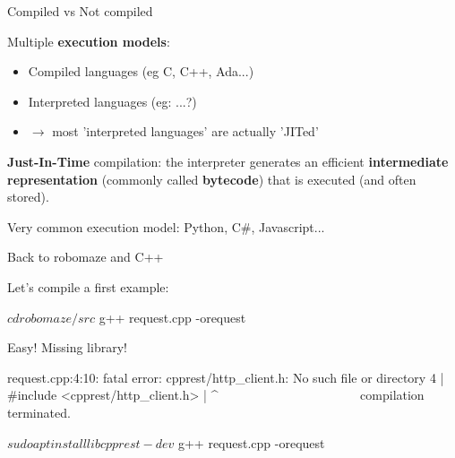 \documentclass[compress]{beamer}
\begin{document}
\begin{frame}{Compiled vs Not compiled}

    Multiple \textbf{execution models}:

    \begin{itemize}
        \item<1-> Compiled languages (eg C, C++, Ada...)
        \item<2-> Interpreted languages (eg: ...?)
        \item<3-> $\rightarrow$ most 'interpreted languages' are actually 'JITed'
    \end{itemize}

     {

    \textbf{Just-In-Time} compilation: the interpreter generates an efficient
    \textbf{intermediate representation} (commonly called \textbf{bytecode})
    that is executed (and often stored).

    Very common execution model: Python, C\#, Javascript...

    }
\end{frame}

\begin{frame}[fragile]{Back to robomaze and C++}

Let's compile a first example:

 \begin{shcode}
$ cd robomaze/src
$ g++ request.cpp -orequest
\end{shcode}

\end{frame}

\begin{frame}[fragile]{Easy! Missing library!}

    \begin{shcode}
request.cpp:4:10: fatal error: cpprest/http_client.h: No such file or directory
    4 | #include <cpprest/http_client.h>
      |          ^~~~~~~~~~~~~~~~~~~~~~~
compilation terminated.
    \end{shcode}

    \pause

    \begin{shcode}
$ sudo apt install libcpprest-dev
$ g++ request.cpp -orequest
    \end{shcode}


\end{frame}
\end{document}
